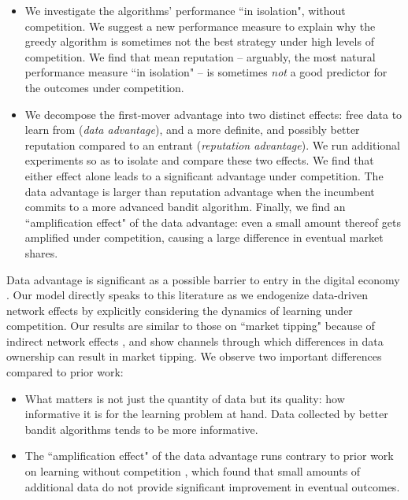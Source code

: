 \begin{itemize}
\item We investigate the algorithms' performance ``in isolation", \ie without competition. We suggest a new performance measure to explain why the greedy algorithm is sometimes not the best strategy under high levels of competition. We find that mean reputation -- arguably, the most natural performance measure ``in isolation" -- is sometimes \emph{not} a good predictor for the outcomes under competition.

\item We decompose the first-mover advantage into two distinct effects: free data to learn from (\emph{data advantage}), and a more definite, and possibly better reputation compared to an entrant (\emph{reputation advantage}). We run additional experiments so as to isolate and compare these two effects. We find that either effect alone leads to a significant advantage under competition. The data advantage is larger than reputation advantage when the incumbent commits to a more advanced bandit algorithm. Finally, we find an ``amplification effect" of the data advantage: even a small amount thereof gets amplified under competition, causing a large difference in eventual market shares.

\end{itemize}




Data advantage is significant as a possible barrier to entry in the digital economy 
\citep[\eg][]{jullien2019economics,de2020data, hagiu2020data}. 
Our model directly speaks to this literature as we endogenize data-driven network effects by explicitly considering the dynamics of learning under competition. Our results are similar to those on ``market tipping" because of indirect network effects , and show channels through which differences in data ownership can result in market tipping. We observe two important differences compared to prior work:
 
\begin{itemize}
\item What matters is not just the quantity of data but its quality: how informative it is for the learning problem at hand. Data collected by better bandit algorithms tends to be more informative.
    

\item The ``amplification effect" of the data advantage runs contrary to prior work on learning without competition \citep{varian2018artificial,lambrecht2015can,bajari2018impact}, which found that small amounts of additional data do not provide significant improvement in eventual outcomes.
\end{itemize}

